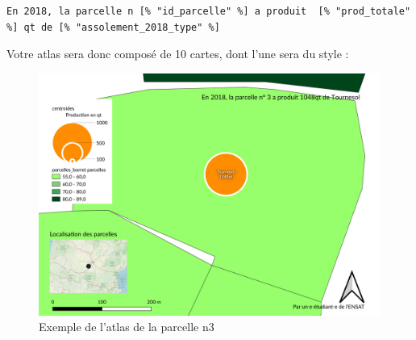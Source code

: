 \begin{verbatim}
En 2018, la parcelle n [% "id_parcelle" %] a produit  [% "prod_totale" %] qt de [% "assolement_2018_type" %]
\end{verbatim}

Votre atlas sera donc composé de 10 cartes, dont l'une sera du style :

\begin{figure}[htbp]
\centering
\includegraphics{figures/map_atlas.png}
\caption{Exemple de l'atlas de la parcelle n3}
\end{figure}
